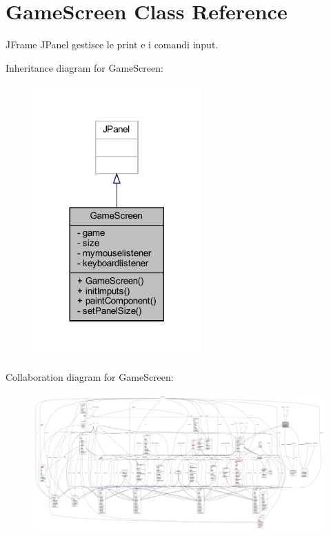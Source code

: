 \hypertarget{classprogetto_1_1_game_screen}{}\section{Game\+Screen Class Reference}
\label{classprogetto_1_1_game_screen}


J\+Frame J\+Panel gestisce le print e i comandi input.  




Inheritance diagram for Game\+Screen\+:\nopagebreak
\begin{figure}[H]
\begin{center}
\leavevmode
\includegraphics[width=182pt]{classprogetto_1_1_game_screen__inherit__graph}
\end{center}
\end{figure}


Collaboration diagram for Game\+Screen\+:
\nopagebreak
\begin{figure}[H]
\begin{center}
\leavevmode
\includegraphics[width=350pt]{classprogetto_1_1_game_screen__coll__graph}
\end{center}
\end{figure}
